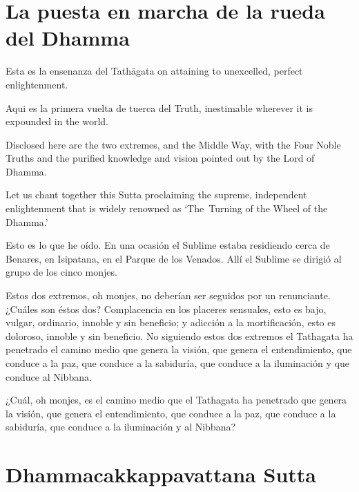 \chapterTocDelegatePageNumber
\chapter{La puesta en marcha de la rueda del Dhamma}

\setTocDelegatedPageNumber
\englishText
\renewcommand{\englishTitle}{La puesta en marcha de la rueda del Dhamma}

\begin{leader}

Esta es la ensenanza del  Tathāgata on attaining to unexcelled,
perfect enlightenment.

Aqui es la primera vuelta de tuerca del Truth,
inestimable wherever it is expounded in the world.

Disclosed here are the two extremes, and the Middle Way, with the Four Noble
Truths and the purified knowledge and vision pointed out by the Lord of
Dhamma.

Let us chant together this Sutta proclaiming the supreme, independent
enlightenment that is widely renowned as ‘The~Turning of the Wheel of
the Dhamma.’

\end{leader}


Esto es lo que he oído. En una ocasión el Sublime estaba residiendo cerca de Benares, en Isipatana, en el Parque de los Venados. Allí el Sublime se dirigió al grupo de los cinco monjes.

Estos dos extremos, oh monjes, no deberían ser seguidos por un renunciante. ¿Cuáles son éstos dos? Complacencia en los placeres sensuales, esto es bajo, vulgar, ordinario, innoble y sin beneficio; y adicción a la mortificación, esto es doloroso, innoble y sin beneficio. No siguiendo estos dos extremos el Tathagata ha penetrado el camino medio que genera la visión, que genera el entendimiento, que conduce a la paz, que conduce a la sabiduría, que conduce a la iluminación y que conduce al Nibbana.

¿Cuál, oh monjes, es el camino medio que el Tathagata ha penetrado que genera la visión, que genera el entendimiento, que conduce a la paz, que conduce a la sabiduría, que conduce a la iluminación y al Nibbana? 



\chapterTocSubIndentTrue
\chapter{Dhammacakkappavattana Sutta}

